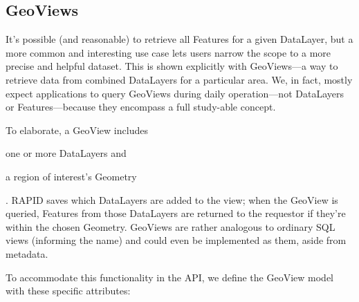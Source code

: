 \subsection{GeoViews}

It's possible (and reasonable) to retrieve all Features for a given DataLayer, but a more common and interesting use case lets users narrow the scope to a more precise and helpful dataset. This is shown explicitly with GeoViews---a way to retrieve data from combined DataLayers for a particular area. We, in fact, mostly expect applications to query GeoViews during daily operation---not DataLayers or Features---because they encompass a full study-able concept.

To elaborate, a GeoView includes 
\begin{enumerate*}[label=\itshape\alph*\upshape)]
\item one or more DataLayers and
\item a region of interest's Geometry
\end{enumerate*}. RAPID saves which DataLayers are added to the view; when the GeoView is queried, Features from those DataLayers are returned to the requestor if they're within the chosen Geometry. GeoViews are rather analogous to ordinary SQL views (informing the name) and could even be implemented as them, aside from metadata.

To accommodate this functionality in the API, we define the GeoView model with these specific attributes:

